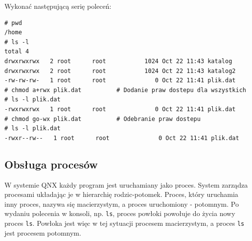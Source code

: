 \begin{example}
Wykonać następującą serię poleceń: 

\begin{lstlisting}[style=MyBashStyle]
# pwd
/home
# ls -l
total 4
drwxrwxrwx   2 root      root           1024 Oct 22 11:43 katalog
drwxrwxrwx   2 root      root           1024 Oct 22 11:43 katalog2
-rw-rw-rw-   1 root      root              0 Oct 22 11:41 plik.dat
# chmod a+rwx plik.dat			# Dodanie praw dostepu dla wszystkich
# ls -l plik.dat 
-rwxrwxrwx   1 root      root              0 Oct 22 11:41 plik.dat
# chmod go-wx plik.dat			# Odebranie praw dostepu
# ls -l plik.dat 
-rwxr--rw--   1 root      root              0 Oct 22 11:41 plik.dat
\end{lstlisting}



\end{example}


\subsection{Obsługa procesów}

W systemie QNX każdy program jest uruchamiany jako proces. System zarządza procesami układając je w hierarchię rodzic-potomek. Proces, który uruchamia inny proces, nazywa się macierzystym, a proces uruchomiony - potomnym. Po wydaniu polecenia w konsoli, np. \lstinline[style=MyBashStyle]{ls}, proces powłoki powołuje do życia nowy proces \lstinline[style=MyBashStyle]{ls}. Powłoka jest więc w tej sytuacji procesem macierzystym, a proces \lstinline[style=MyBashStyle]{ls} jest procesem potomnym.


